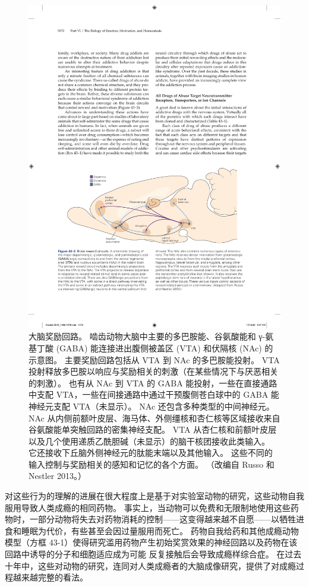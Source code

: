 \begin{figure}[htbp]
	\centering
	\includegraphics[width=0.9\linewidth]{chap43/fig_43_3}
	\caption{大脑奖励回路。 啮齿动物大脑中主要的多巴胺能、谷氨酸能和 γ-氨基丁酸 (GABA) 能连接进出腹侧被盖区 (VTA) 和伏隔核 (NAc) 的示意图。 主要奖励回路包括从 VTA 到 NAc 的多巴胺能投射。 VTA 投射释放多巴胺以响应与奖励相关的刺激（在某些情况下与厌恶相关的刺激）。 也有从 NAc 到 VTA 的 GABA 能投射，一些在直接通路中支配 VTA，一些在间接通路中通过干预腹侧苍白球中的 GABA 能神经元支配 VTA（未显示）。 NAc 还包含多种类型的中间神经元。 NAc 从内侧前额叶皮层、海马体、外侧缰核和杏仁核等区域接收来自谷氨酸能单突触回路的密集神经支配。 VTA 从杏仁核和前额叶皮层以及几个使用递质乙酰胆碱（未显示）的脑干核团接收此类输入。 它还接收下丘脑外侧神经元的肽能末端以及其他输入。 这些不同的输入控制与奖励相关的感知和记忆的各个方面。 （改编自 Russo 和 Nestler 2013。）}
	\label{fig:43_3}
\end{figure}

对这些行为的理解的进展在很大程度上是基于对实验室动物的研究，这些动物自我服用导致人类成瘾的相同药物。 事实上，当动物可以免费和无限制地使用这些药物时，一部分动物将失去对药物消耗的控制——这变得越来越不自愿——以牺牲进食和睡眠为代价，有些甚至会因过量服用而死亡。 药物自我给药和其他成瘾动物模型（方框 43-1）使得研究滥用药物产生初始奖赏效果的神经回路以及药物在该回路中诱导的分子和细胞适应成为可能 反复接触后会导致成瘾样综合症。 在过去十年中，这些对动物的研究，连同对人类成瘾者的大脑成像研究，提供了对成瘾过程越来越完整的看法。

